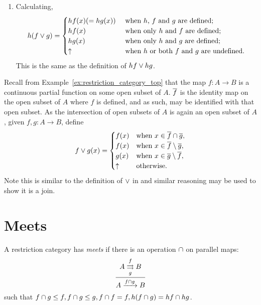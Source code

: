 \begin{example}
\begin{enumerate}[{(}i{)}]
    \item Calculating,
      \[
         h(f\vee g) = \begin{cases}
           hf(x)( = h g(x))& \text{ when $h$, $f$ and $g$ are defined;}\\
           hf(x)& \text{ when only $h$ and $f$ are defined;}\\
           h g(x)& \text{ when only $h$ and $g$ are defined;}\\
           \uparrow & \text{ when $h$ or both $f$ and $g$ are undefined.}
         \end{cases}
       \]
       This is the same as the definition of $h f \vee h g$.
  \end{enumerate}

\end{example}
\begin{example}\label{ex:joins_in_top}
   Recall from Example~\ref{ex:restriction_category_top} that the map $f:A\to B$ is a continuous
   partial function on some open subset of $A$. $\overline{f}$ is the identity map on the open subset of
   $A$ where $f$ is defined, and as such, may be identified with that open subset.
   As the intersection of open subsets of $A$ is again
   an open subset of $A$, given $f,g:A\to B$, define
   \[
      f\vee g(x) = \begin{cases}
        f(x) &\text{when }x\in  \overline{f}\cap\overline{g},\\
        f(x) &\text{when }x\in  \overline{f}\setminus\overline{g},\\
        g(x) &\text{when }x\in  \overline{g}\setminus\overline{f},\\
        \uparrow &\text{otherwise.}
      \end{cases}
   \]
   Note this is similar to the definition of $\vee$ in \Par and similar reasoning may be used to
   show it is a join.
\end{example}



\section{Meets} %
\label{sub:meets_in_restriction_categories}

\begin{definition}\label{def:meet_in_a_restriction_category}
  A restriction category has \emph{meets} if there is an operation $\cap$ on parallel maps:
  \[
    \infer{A\xrightarrow{f\meet g} B}
      {A\overset{f}{\underset{g}{\rightrightarrows}}B}
  \]
  such that $f\cap g \le f, f\cap g \le g, f\cap f = f, h (f\cap g) = h f \cap h g$.
\end{definition}

